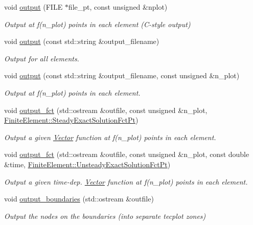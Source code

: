 \begin{DoxyCompactItemize}
void \hyperlink{classoomph_1_1Mesh_a926a1595fd8e9932e8c87a58a7ae23e1}{output} (F\+I\+LE $\ast$file\+\_\+pt, const unsigned \&nplot)
\begin{DoxyCompactList}\small\item\em Output at f(n\+\_\+plot) points in each element (C-\/style output) \end{DoxyCompactList}\item 
void \hyperlink{classoomph_1_1Mesh_a411332db681ec982e88f60c40b3b648d}{output} (const std\+::string \&output\+\_\+filename)
\begin{DoxyCompactList}\small\item\em Output for all elements. \end{DoxyCompactList}\item 
void \hyperlink{classoomph_1_1Mesh_ac9f8eb8a56f81fe525a36157bd166ea0}{output} (const std\+::string \&output\+\_\+filename, const unsigned \&n\+\_\+plot)
\begin{DoxyCompactList}\small\item\em Output at f(n\+\_\+plot) points in each element. \end{DoxyCompactList}\item 
void \hyperlink{classoomph_1_1Mesh_a7c5d6492f33fcd0dc7a65b7bc2a2dde2}{output\+\_\+fct} (std\+::ostream \&outfile, const unsigned \&n\+\_\+plot, \hyperlink{classoomph_1_1FiniteElement_a690fd33af26cc3e84f39bba6d5a85202}{Finite\+Element\+::\+Steady\+Exact\+Solution\+Fct\+Pt})
\begin{DoxyCompactList}\small\item\em Output a given \hyperlink{classoomph_1_1Vector}{Vector} function at f(n\+\_\+plot) points in each element. \end{DoxyCompactList}\item 
void \hyperlink{classoomph_1_1Mesh_a56d3007b3d8a11c8f5852bcfcc1d195d}{output\+\_\+fct} (std\+::ostream \&outfile, const unsigned \&n\+\_\+plot, const double \&time, \hyperlink{classoomph_1_1FiniteElement_ad4ecf2b61b158a4b4d351a60d23c633e}{Finite\+Element\+::\+Unsteady\+Exact\+Solution\+Fct\+Pt})
\begin{DoxyCompactList}\small\item\em Output a given time-\/dep. \hyperlink{classoomph_1_1Vector}{Vector} function at f(n\+\_\+plot) points in each element. \end{DoxyCompactList}\item 
void \hyperlink{classoomph_1_1Mesh_af6effab50e32290d4d8066440b9b3e37}{output\+\_\+boundaries} (std\+::ostream \&outfile)
\begin{DoxyCompactList}\small\item\em Output the nodes on the boundaries (into separate tecplot zones) \end{DoxyCompactList}\item 

\end{DoxyCompactItemize}
